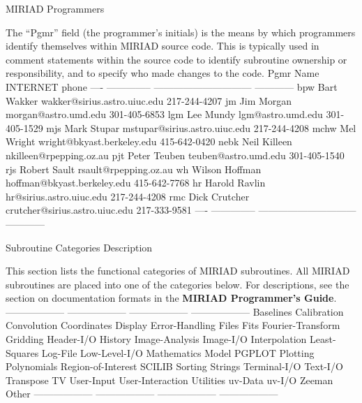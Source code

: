 \beginsection MIRIAD Programmers
\par The ``Pgmr'' field (the programmer's initials) is the means by which
programmers identify themselves within MIRIAD source code. This
is typically used in comment statements within the source code to
identify subroutine ownership or responsibility, and to specify who
made changes to the code.
{\eightpoint\begintt
Pgmr     Name                      INTERNET               phone
----  --------------    ------------------------------ ------------
bpw   Bart Wakker       wakker@sirius.astro.uiuc.edu   217-244-4207
jm    Jim Morgan        morgan@astro.umd.edu           301-405-6853
lgm   Lee Mundy         lgm@astro.umd.edu              301-405-1529
mjs   Mark Stupar       mstupar@sirius.astro.uiuc.edu  217-244-4208
mchw  Mel Wright        wright@bkyast.berkeley.edu     415-642-0420
nebk  Neil Killeen      nkilleen@rpepping.oz.au
pjt   Peter Teuben      teuben@astro.umd.edu           301-405-1540
rjs   Robert Sault      rsault@rpepping.oz.au
wh    Wilson Hoffman    hoffman@bkyast.berkeley.edu    415-642-7768
hr    Harold Ravlin     hr@sirius.astro.uiuc.edu       217-244-4208
rmc   Dick Crutcher     crutcher@sirius.astro.uiuc.edu 217-333-9581
----  --------------    ------------------------------ ------------
\endtt}

\beginsection Subroutine Categories Description
\par This section lists the functional categories of MIRIAD
subroutines. All MIRIAD subroutines are placed into one of the
categories below.  For descriptions, see the section on documentation
formats in the {\bf MIRIAD Programmer's Guide}.
{\eightpoint\begintt
------------------  ------------------  ------------------  ------------------
Baselines           Calibration         Convolution         Coordinates
Display             Error-Handling      Files               Fits
Fourier-Transform   Gridding            Header-I/O          History
Image-Analysis      Image-I/O           Interpolation       Least-Squares
Log-File            Low-Level-I/O       Mathematics         Model
PGPLOT              Plotting            Polynomials         Region-of-Interest
SCILIB              Sorting             Strings             Terminal-I/O
Text-I/O            Transpose           TV                  User-Input
User-Interaction    Utilities           uv-Data             uv-I/O
Zeeman              Other
------------------  ------------------  ------------------  ------------------
\endtt}

